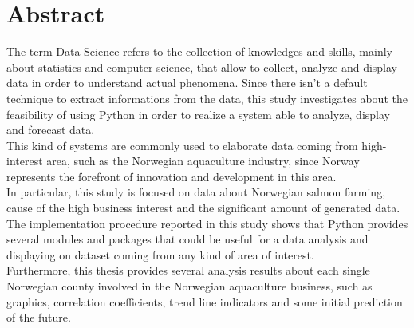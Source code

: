 \clearpage 

\chapter{Abstract}

The term Data Science refers to the collection of knowledges and skills, mainly about statistics and computer science, that allow to collect, analyze and display data in order to understand actual phenomena. Since there isn't a default technique to extract informations from the data, this study investigates about the feasibility of using Python in order to realize a system able to analyze, display and forecast data. \\
This kind of systems are commonly used to elaborate data coming from high-interest area, such as the Norwegian aquaculture industry, since Norway represents the forefront of innovation and development in this area. \\
In particular, this study is focused on data about Norwegian salmon farming, cause of the high business interest and the significant amount of generated data. \\
The implementation procedure reported in this study shows that Python provides several modules and packages that could be useful for a data analysis and displaying on dataset coming from any kind of area of interest. \\
Furthermore, this thesis provides several analysis results about each single Norwegian county involved in the Norwegian aquaculture business, such as graphics, correlation coefficients, trend line indicators and some initial prediction of the future.



